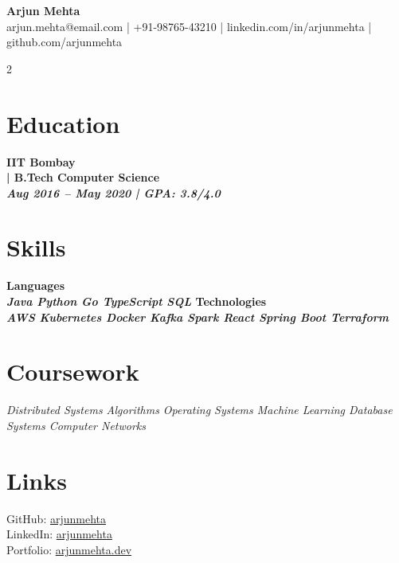 \documentclass[a4paper,10pt]{article}
\newcommand{\runsubsection}[1]{\fontsize{10pt}{12pt}\selectfont\bfseries\color{subheadings}#1\normalfont}
\newcommand{\descript}[1]{\fontsize{9pt}{11pt}\selectfont\color{primary} | #1\normalfont}
\newcommand{\location}[1]{\fontsize{8pt}{10pt}\selectfont\color{datecolor}\textit{#1}\normalfont\vspace{1pt}}
\begin{document}
\begin{center}
{\fontsize{28pt}{32pt}\selectfont\color{primary}\textbf{Arjun Mehta}}\\[4pt]
{\fontsize{9pt}{11pt}\selectfont\color{headings}
arjun.mehta@email.com | +91-98765-43210 | linkedin.com/in/arjunmehta | github.com/arjunmehta}
\end{center}

\vspace{-4pt}

\begin{paracol}{2}

\section{Education}
\runsubsection{IIT Bombay}\\
\descript{B.Tech Computer Science}\\
\location{Aug 2016 -- May 2020 | GPA: 3.8/4.0}
\vspace{4pt}

\section{Skills}
\runsubsection{Languages}\\
\location{Java \textbullet{} Python \textbullet{} Go \textbullet{} TypeScript \textbullet{} SQL}
\vspace{4pt}
\runsubsection{Technologies}\\
\location{AWS \textbullet{} Kubernetes \textbullet{} Docker \textbullet{} Kafka \textbullet{} Spark \textbullet{} React \textbullet{} Spring Boot \textbullet{} Terraform}
\vspace{4pt}

\section{Coursework}
\location{Distributed Systems \textbullet{} Algorithms \textbullet{} Operating Systems \textbullet{} Machine Learning \textbullet{} Database Systems \textbullet{} Computer Networks}
\vspace{4pt}

\section{Links}
GitHub: \href{https://github.com/arjunmehta}{arjunmehta}\\
LinkedIn: \href{https://linkedin.com/in/arjunmehta}{arjunmehta}\\
Portfolio: \href{https://arjunmehta.dev}{arjunmehta.dev}


\end{paracol}
\end{document}
